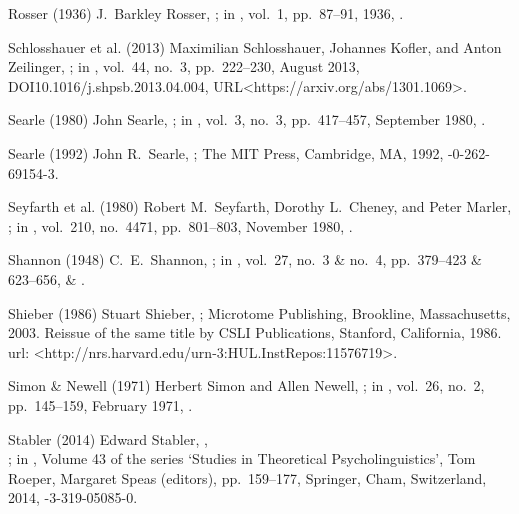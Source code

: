 \biblabel Rosser (1936)
J.\ Barkley Rosser,
;
in ,
vol.\ 1, pp.\ 87--91, 1936,
.

\biblabel Schlosshauer et al. (2013)
Maximilian Schlosshauer, Johannes Kofler, and Anton Zeilinger,
;
in ,
vol.\ 44, no.\ 3, pp.\ 222--230, August 2013,
DOI{10.1016/j.shpsb.2013.04.004},
URL<https://arxiv.org/abs/1301.1069>.

\biblabel Searle (1980)
John Searle,
;
in ,
vol.\ 3, no.\ 3, pp.\ 417--457, September 1980,
.

\biblabel Searle (1992)
John R.\ Searle,
;
The MIT Press, Cambridge, MA, 1992,
-0-262-69154-3.

\biblabel Seyfarth et al. (1980)
Robert M.\ Seyfarth, Dorothy L.\ Cheney, and Peter Marler,
;
in ,
vol.\ 210, no.\ 4471, pp.\ 801--803, November 1980,
.

\biblabel Shannon (1948)
C.\ E.\ Shannon,
;
in ,
vol.\ 27, no.\ 3 \& no.\ 4, pp.\ 379--423 \& 623--656,
 \&
.

\biblabel Shieber (1986)
Stuart Shieber,
;
Microtome Publishing, Brookline, Massachusetts, 2003.
Reissue of the same title by
CSLI Publications, Stanford, California, 1986.\\
{\sc url:} \URL<http://nrs.harvard.edu/urn-3:HUL.InstRepos:11576719>.

\biblabel Simon \& Newell (1971)
Herbert Simon and Allen Newell,
;
in ,
 vol.\ 26, no.\ 2, pp.\ 145--159, February 1971,
.

\biblabel Stabler (2014)
Edward Stabler,
,\\
;
in ,
Volume 43 of the series ‘Studies in Theoretical Psycholinguistics’,
Tom Roeper, Margaret Speas (editors),
pp.\ 159--177,
Springer, Cham, Switzerland, 2014,
-3-319-05085-0.


